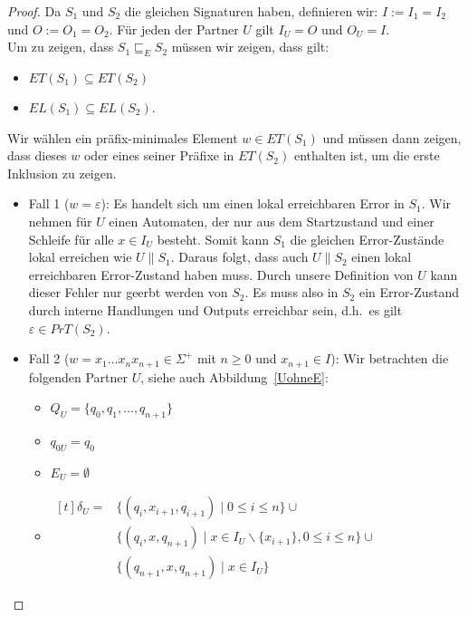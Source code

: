 \begin{proof}
  Da $S_1$ und $S_2$ die gleichen Signaturen haben, definieren wir:
  $I:=I_1=I_2$ und $O:=O_1=O_2$. Für jeden der Partner $U$ gilt $I_U=O$ und
  $O_U=I$.\\
  Um zu zeigen, dass $S_1\sqsubseteq _E S_2$ müssen wir zeigen, dass gilt:
  \begin{itemize}
    \item $ET(S_1)\subseteq ET(S_2)$
    \item $EL(S_1)\subseteq EL(S_2)$.
  \end{itemize}
  Wir wählen ein präfix-minimales Element $w\in ET(S_1)$ und müssen dann
  zeigen, dass dieses $w$ oder eines seiner Präfixe in $ET(S_2)$ enthalten ist,
  um
  die erste Inklusion zu zeigen.
  \begin{itemize}
    \item Fall 1 ($w=\varepsilon$): Es handelt sich um einen lokal erreichbaren
      Error in $S_1$.
      Wir nehmen für $U$ einen Automaten, der nur aus dem Startzustand und
      einer Schleife für alle $x\in I_U$ besteht. Somit kann $S_1$ die gleichen
      Error-Zustände lokal erreichen wie $U\|S_1$. Daraus folgt, dass auch
      $U\|S_2$ einen lokal erreichbaren Error-Zustand haben muss. Durch unsere
      Definition von $U$ kann dieser Fehler nur geerbt werden von $S_2$. Es
      muss also in $S_2$ ein Error-Zustand durch interne Handlungen und Outputs
      erreichbar sein, d.h.\ es gilt $\varepsilon\in PrT(S_2)$.
    \item Fall 2 ($w=x_1\dots x_n x_{n+1}\in\Sigma ^+$ mit $n\geq 0$ und
      $x_{n+1}\in I$): Wir betrachten die folgenden Partner $U$, siehe auch
      Abbildung~\ref{UohneE}:
      \begin{itemize}
        \item $Q_U=\{q_0,q_1,\dots ,q_{n+1}\}$
        \item $q_{0U}=q_0$
        \item $E_U=\emptyset$
        \item $\begin{aligned}[t]
            \delta _U=&\{(q_i,x_{i+1},q_{i+1})\mid  0\leq i\leq n\}\cup\\
                      &\{(q_i,x,q_{n+1})\mid  x\in I_U\backslash\{x_{i+1}\},
          0\leq i\leq n\}\cup\\
          &\{(q_{n+1},x,q_{n+1})\mid  x\in I_U\}
        \end{aligned}$
      \end{itemize}
      \begin{figure} [h!tbp]
      \begin{center}
        \begin{tikzpicture}[->, >=latex',auto,node distance =3cm, semithick]


\end{tikzpicture}
\end{center}
\end{figure}
\end{itemize}
\end{proof}

